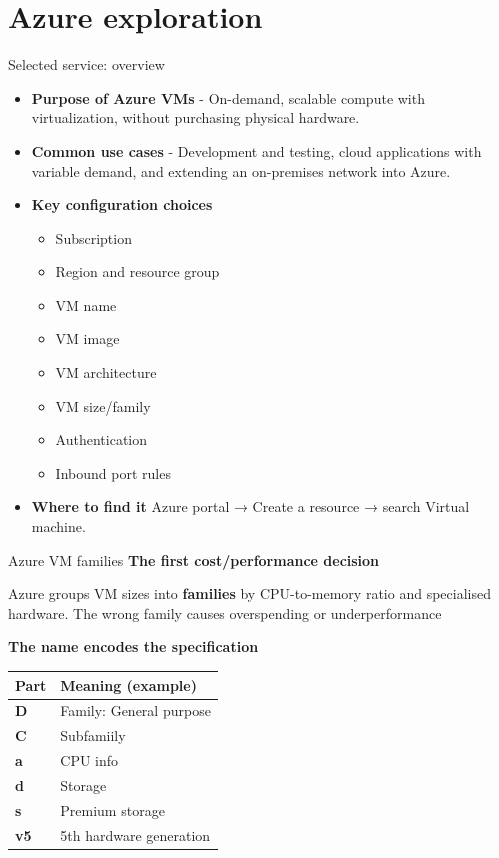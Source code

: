 \documentclass[aspectratio=169,xcolor=dvipsnames]{beamer}
\begin{document}
	\section{Azure exploration}
	\begin{frame}{Selected service: overview}
		\begin{itemize}
			\item \textbf{Purpose of Azure VMs} - On-demand, scalable compute with virtualization, without purchasing physical hardware.
			\item \textbf{Common use cases} - Development and testing, cloud applications with variable demand, and extending an on-premises network into Azure.
			\item \textbf{Key configuration choices}
			\begin{itemize}
				\item Subscription
				\item Region and resource group
				\item VM name
				\item VM image
				\item VM architecture
				\item VM size/family
				\item Authentication
				\item Inbound port rules
			\end{itemize}
			\item \textbf{Where to find it} Azure portal → Create a resource → search Virtual machine.
		\end{itemize}
	\end{frame}
	\begin{frame}{Azure VM families}
		\textbf{The first cost/performance decision}
		
		\vspace{0.2cm}
		Azure groups VM sizes into \textbf{families} by CPU-to-memory ratio and
		specialised hardware. The wrong family causes overspending
		or underperformance
		
		\vspace{0.3cm}
		\textbf{The name encodes the specification}
		
		\vspace{0.1cm}
		{\footnotesize
			\begin{center}
				\begin{tabular}{@{}ll@{}}
					\toprule
					\textbf{Part} & \textbf{Meaning (example)} \\
					\midrule
					\textbf{D}  & Family: General purpose \\
					\textbf{C}  & Subfamiily \\
					\textbf{a}  & CPU info \\
					\textbf{d}  & Storage \\
					\textbf{s}  & Premium storage \\
					\textbf{v5} & 5th hardware generation \\
					\bottomrule
				\end{tabular}
			\end{center}
		}
	\end{frame}
\end{document}
